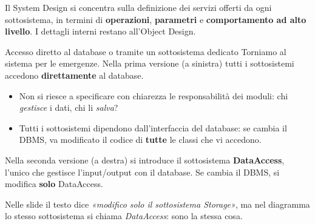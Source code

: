 Il System Design si concentra sulla definizione dei servizi offerti da ogni sottosistema, in termini di
\textbf{operazioni}, \textbf{parametri} e \textbf{comportamento ad alto livello}. I dettagli interni restano all'Object
Design.

\begin{esempio}{Accesso diretto al database o tramite un sottosistema dedicato}
Torniamo al sistema per le emergenze. Nella prima versione (a sinistra) tutti i sottosistemi accedono \textbf{direttamente}
al database.
\begin{itemize}
  \item Non si riesce a specificare con chiarezza le responsabilità dei moduli: chi \textit{gestisce} i dati, chi li
        \textit{salva}?
  \item Tutti i sottosistemi dipendono dall'interfaccia del database: se cambia il DBMS, va modificato il codice di
        \textbf{tutte} le classi che vi accedono.
\end{itemize}
Nella seconda versione (a destra) si introduce il sottosistema \textbf{DataAccess}, l'unico che gestisce l'input/output con
il database. Se cambia il DBMS, si modifica \textbf{solo} DataAccess.

\begin{center}
\end{center}
Nelle slide il testo dice \textit{«modifico solo il sottosistema Storage»}, ma nel diagramma lo stesso sottosistema si
chiama \textit{DataAccess}: sono la stessa cosa.
\end{esempio}

